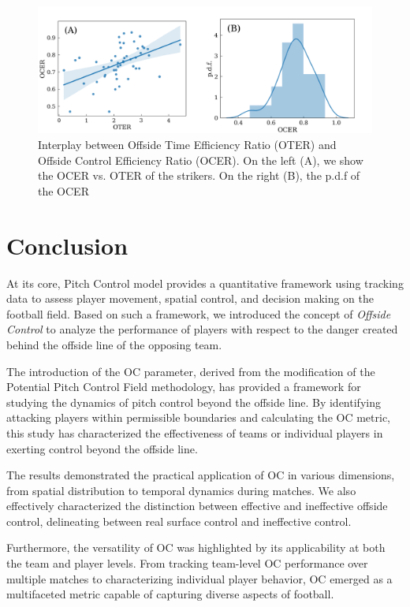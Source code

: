 \documentclass[
  10pt,
  twoside,nohyper]{book}
\begin{document}
\begin{figure}[H]

{\centering \includegraphics[width=0.8\linewidth,]{imagenes/av_eff} 

}

\caption{Interplay between Offside Time Efficiency Ratio (OTER) and Offside Control Efficiency Ratio (OCER). On the left (A), we show the OCER vs. OTER of the strikers. On the right (B), the p.d.f of the OCER}\label{fig:forwardsglob}
\end{figure}

\chapter{Conclusion}\label{conclusion}

At its core, Pitch Control model provides a quantitative framework using tracking data to assess player movement, spatial control, and decision making on the football field. Based on such a framework, we introduced the concept of \emph{Offside Control} to analyze the performance of players with respect to the danger created behind the offside line of the opposing team.

The introduction of the OC parameter, derived from the modification of the Potential Pitch Control Field methodology, has provided a framework for studying the dynamics of pitch control beyond the offside line. By identifying attacking players within permissible boundaries and calculating the OC metric, this study has characterized the effectiveness of teams or individual players in exerting control beyond the offside line.

The results demonstrated the practical application of OC in various dimensions, from spatial distribution to temporal dynamics during matches. We also effectively characterized the distinction between effective and ineffective offside control, delineating between real surface control and ineffective control.

Furthermore, the versatility of OC was highlighted by its applicability at both the team and player levels. From tracking team-level OC performance over multiple matches to characterizing individual player behavior, OC emerged as a multifaceted metric capable of capturing diverse aspects of football.
\end{document}
